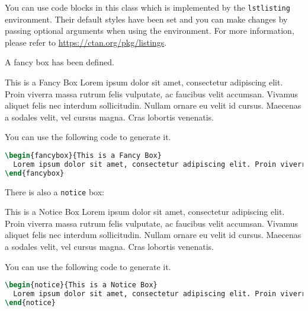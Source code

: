 \documentclass[twoside]{seu-ml-assign}
\begin{document}
     You can use code blocks in this class which is implemented by the \texttt{lstlisting} environment.
    Their default styles have been set and you can make changes by passing optional arguments when using the environment.
    For more information, please refer to \url{https://ctan.org/pkg/listings}.

     A fancy box has been defined.
      \begin{fancybox}{This is a Fancy Box}
        Lorem ipsum dolor sit amet, consectetur adipiscing elit. Proin viverra massa rutrum felis vulputate, ac faucibus velit accumsan. Vivamus aliquet felis nec interdum sollicitudin. Nullam ornare eu velit id cursus. Maecenas a sodales velit, vel cursus magna. Cras lobortis venenatis.
      \end{fancybox}

    You can use the following code to generate it.
    \begin{lstlisting}[language=tex,numbers=none,morekeywords={begin}]
\begin{fancybox}{This is a Fancy Box}
  Lorem ipsum dolor sit amet, consectetur adipiscing elit. Proin viverra massa rutrum felis vulputate, ac faucibus velit accumsan. Vivamus aliquet felis nec interdum sollicitudin. Nullam ornare eu velit id cursus. Maecenas a sodales velit, vel cursus magna. Cras lobortis venenatis.
\end{fancybox}
    \end{lstlisting}

    There is also a \texttt{notice} box:
    \begin{notice}{This is a Notice Box}
      Lorem ipsum dolor sit amet, consectetur adipiscing elit. Proin viverra massa rutrum felis vulputate, ac faucibus velit accumsan. Vivamus aliquet felis nec interdum sollicitudin. Nullam ornare eu velit id cursus. Maecenas a sodales velit, vel cursus magna. Cras lobortis venenatis.
    \end{notice}

    You can use the following code to generate it.
    \begin{lstlisting}[language=tex,numbers=none,morekeywords={begin}]
\begin{notice}{This is a Notice Box}
  Lorem ipsum dolor sit amet, consectetur adipiscing elit. Proin viverra massa rutrum felis vulputate, ac faucibus velit accumsan. Vivamus aliquet felis nec interdum sollicitudin. Nullam ornare eu velit id cursus. Maecenas a sodales velit, vel cursus magna. Cras lobortis venenatis.
\end{notice}
    \end{lstlisting}
\end{document}
